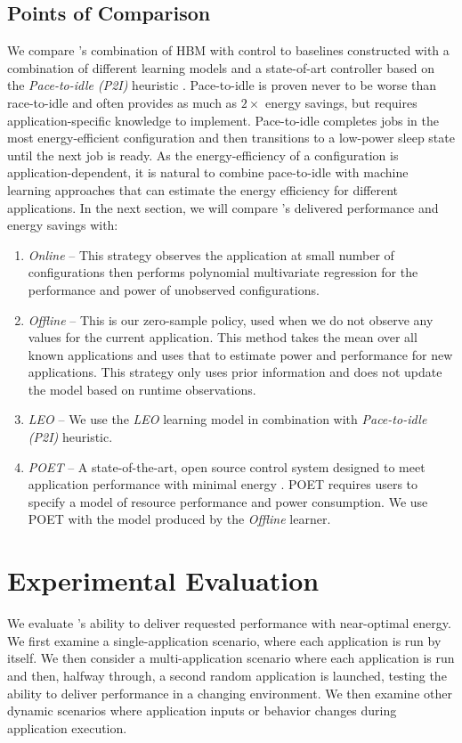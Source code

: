 \subsection{Points of Comparison}
We compare \SYSTEM{}'s combination of HBM with control to baselines
constructed with a combination of different learning models and a
state-of-art controller based on the \emph{Pace-to-idle (P2I)}
heuristic \cite{kim-cpsna}.  Pace-to-idle is proven never to be worse
than race-to-idle and often provides as much as $2\times$ energy
savings, but requires application-specific knowledge to implement.
Pace-to-idle completes jobs in the most energy-efficient configuration
and then transitions to a low-power sleep state until the next job is
ready.  As the energy-efficiency of a configuration is
application-dependent, it is natural to combine pace-to-idle with
machine learning approaches that can estimate the energy efficiency
for different applications.  In the next section, we will compare
\SYSTEM{}'s delivered performance and energy savings with:
\begin{enumerate}
\item \textit{Online} -- This strategy observes the
  application at small number of configurations then performs
  polynomial multivariate regression for the performance and
  power of unobserved configurations. 
\item \textit{Offline} -- This is our zero-sample policy, used
  when we do not observe any values for the current application. This
  method takes the mean over all known applications and uses that to
  estimate power and performance for new applications. This strategy
  only uses prior information and does not update the model based on
  runtime observations. 
\item \textit{LEO} -- We use the \textit{LEO} learning model in
  combination with \emph{Pace-to-idle (P2I)} heuristic.
\item \textit{POET} -- A state-of-the-art, open source control system
  designed to meet application performance with minimal energy
  \cite{POET}.  POET requires users to specify a model of resource
  performance and power consumption.  We use POET with the model
  produced by the \emph{Offline} learner.
\end{enumerate}

\section{Experimental Evaluation}
We evaluate \SYSTEM{}'s ability to deliver requested performance with
near-optimal energy.  We first examine a single-application scenario,
where each application is run by itself.  We then consider a
multi-application scenario where each application is run and then,
halfway through, a second random application is launched, testing the
ability to deliver performance in a changing environment.  We then
examine other dynamic scenarios where application inputs or behavior
changes during application execution.

